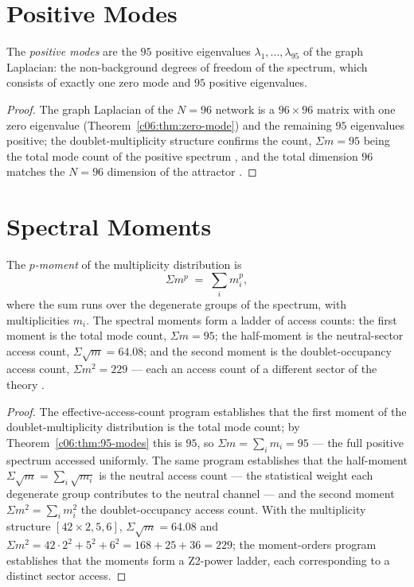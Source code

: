 \section{Positive Modes}
\label{c06:sec:positive-modes}

\begin{theorem}
\label{c06:thm:95-modes}
The \emph{positive modes} are the $95$ positive eigenvalues
$\lambda_1,\dots,\lambda_{95}$ of the graph Laplacian: the non-background degrees of
freedom of the spectrum, which consists of exactly one zero mode and $95$ positive
eigenvalues.
\end{theorem}

\begin{proof}
The graph Laplacian of the $N=96$ network is a $96\times96$ matrix with one zero eigenvalue
(Theorem~\ref{c06:thm:zero-mode}) and the remaining $95$ eigenvalues positive; the
doublet-multiplicity structure confirms the count, $\Sigma m = 95$ being the total mode
count of the positive spectrum \cite{c06:QG157}, and the total dimension $96$ matches the
$N=96$ dimension of the attractor \cite{c06:QG155}.
\end{proof}

\section{Spectral Moments}
\label{c06:sec:spectral-moments}

\begin{theorem}
\label{c06:cor:moment-ladder}
The \emph{$p$-moment} of the multiplicity distribution is
\begin{equation}
\label{c06:eq:moment}
\Sigma m^p \;=\; \sum_i m_i^p,
\end{equation}
where the sum runs over the degenerate groups of the spectrum, with multiplicities $m_i$.
The spectral moments form a ladder of access counts: the first moment is the total mode
count, $\Sigma m = 95$; the half-moment is the neutral-sector access count,
$\Sigma\sqrt{m} = 64.08$; and the second moment is the doublet-occupancy access count,
$\Sigma m^2 = 229$ --- each an access count of a different sector of the theory
\cite{c06:QG157,c06:QG158}.
\end{theorem}

\begin{proof}
The effective-access-count program \cite{c06:QG157} establishes that the first moment of the
doublet-multiplicity distribution is the total mode count; by
Theorem~\ref{c06:thm:95-modes} this is $95$, so $\Sigma m = \sum_i m_i = 95$ --- the full
positive spectrum accessed uniformly. The same program establishes that the half-moment
$\Sigma\sqrt{m} = \sum_i \sqrt{m_i}$ is the neutral access count --- the statistical weight
each degenerate group contributes to the neutral channel --- and the second moment
$\Sigma m^2 = \sum_i m_i^2$ the doublet-occupancy access count. With the multiplicity
structure $[42\times2,5,6]$, $\Sigma\sqrt{m} = 64.08$ and
$\Sigma m^2 = 42\cdot 2^2 + 5^2 + 6^2 = 168+25+36 = 229$; the moment-orders program
\cite{c06:QG158} establishes that the moments form a Z2-power ladder, each corresponding to a
distinct sector access.
\end{proof}

